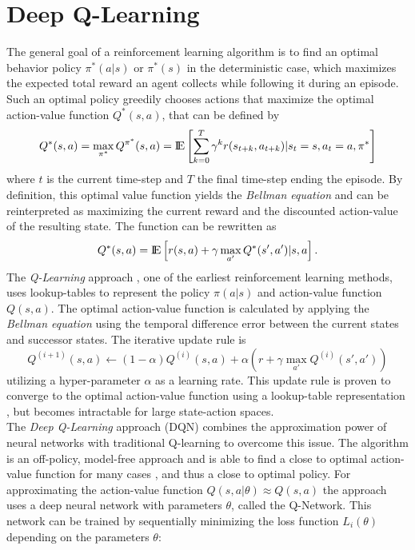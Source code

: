 \section{Deep Q-Learning}
\label{sec:pre}
The general goal of a reinforcement learning algorithm is to find an optimal behavior policy $\pi^*(a|s)$ or $\pi^*(s)$ in the deterministic case, which maximizes the expected total reward an agent collects while following it during an episode. Such an optimal policy greedily chooses actions that maximize the optimal action-value function $Q^*(s,a)$, that can be defined by 
\[ 
Q^*(s,a)=\max_{\pi^*} Q^{\pi^*}(s,a) =  {\rm I\!E} \left[
\sum_{k=0}^{T}\gamma^{k}r(s_{t+k},a_{t+k})|s_t=s,a_t=a,\pi^*\right] 
\]
where $t$ is the current time-step and $T$ the final time-step ending the episode. By definition, this optimal value function yields the \textit{Bellman equation} \citep{sutton2018reinforcement} and can be reinterpreted as maximizing the current reward and the discounted action-value of the resulting state. The function can be rewritten as
\[
Q^*(s,a) = {\rm I\!E} \left[
r(s,a) + \gamma \max_{a'}Q^*(s',a')|s,a \right].
\]
The \textit{Q-Learning} approach \citep{watkins1992q}, one of the earliest reinforcement learning methods, uses lookup-tables to represent the policy $\pi(a|s)$ and action-value function $Q(s,a)$. The optimal action-value function is calculated by applying the \textit{Bellman equation} using the temporal difference error between the current states and successor states. The iterative update rule is 
\[
Q^{(i+1)}(s,a) \leftarrow (1-\alpha) Q^{(i)}(s,a) + \alpha \left( r + \gamma \max_{a'} Q^{(i)}(s',a') \right)
\]
utilizing a hyper-parameter $\alpha$ as a learning rate. This update rule is proven to converge to the optimal action-value function using a lookup-table representation \citep{watkins1992q, jaakkola1994convergence, ribeiro1996q}, but becomes intractable for large state-action spaces. \\
The \textit{Deep Q-Learning} approach (DQN) \citep{mnih2013playing} combines the approximation power of neural networks with traditional Q-learning to overcome this issue. The algorithm is an off-policy, model-free approach and is able to find a close to optimal action-value function for many cases \citep{mnih2015human}, and thus a close to optimal policy. For approximating the action-value function $Q(s,a|\theta)\approx Q(s,a)$ the approach uses a deep neural network with parameters $\theta$, called the Q-Network.
This network can be trained by sequentially minimizing the loss function $L_i(\theta)$ depending on the parameters $\theta$:
